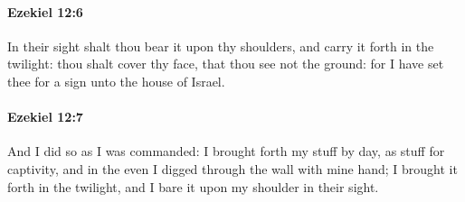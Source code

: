 		\paragraph{Ezekiel 12:6} %
			\label{EZEKIEL-12-6}

			In their sight shalt thou bear it upon thy shoulders, and carry it forth in the twilight: thou shalt cover thy face, that thou see not the ground: for I have set thee for a sign unto the house of Israel.


		\paragraph{Ezekiel 12:7} %
			\label{EZEKIEL-12-7}

			And I did so as I was commanded: I brought forth my stuff by day, as stuff for captivity, and in the even I digged through the wall with mine hand; I brought it forth in the twilight, and I bare it upon my shoulder in their sight.


